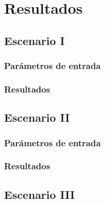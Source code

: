 
\chapter{Resultados} %

\label{Chapter7} %



\section{Escenario I} 
\subsection{Parámetros de entrada}
\subsection{Resultados}


\section{Escenario II}
\subsection{Parámetros de entrada}
\subsection{Resultados}


\section{Escenario III}
